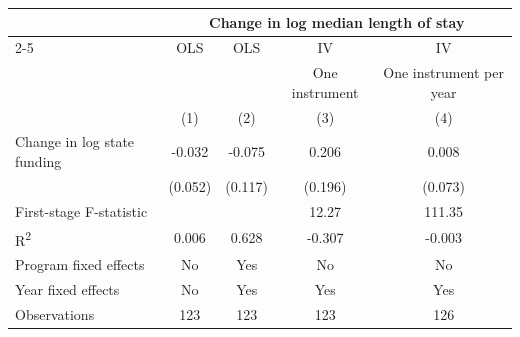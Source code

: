 \begin{table}[htbp]
\centering
\label{tab:iv_mlos_total}
\begin{tabular}{l*{4}{c}}
\toprule
 & \multicolumn{4}{c}{Change in log median length of stay} \\
\cmidrule(lr){2-5}
 & OLS & OLS & IV & IV \\
 &  &  & One instrument & One instrument per year \\
 & (1) & (2) & (3) & (4) \\
\midrule
Change in log state funding & -0.032 & -0.075 & 0.206 & 0.008 \\
 & (0.052) & (0.117) & (0.196) & (0.073) \\
First-stage F-statistic &  &  & 12.27 & 111.35 \\
R\textsuperscript{2} & 0.006 & 0.628 & -0.307 & -0.003 \\
Program fixed effects & No & Yes & No & No \\
Year fixed effects & No & Yes & Yes & Yes \\
Observations & 123 & 123 & 123 & 126 \\
\bottomrule
\end{tabular}
\end{table}
